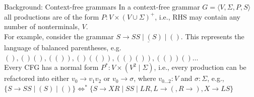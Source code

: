 \documentclass{beamer}
\begin{document}
    \begin{frame}{Background: Context-free grammars}
        In a context-free grammar $G = \langle V, \Sigma, P, S\rangle$ all productions are of the form $P: V\times (V \cup \Sigma)^+$, i.e., RHS may contain any number of nonterminals, $V$.\newline\\
        For example, consider the grammar $\underline{S \rightarrow S S \mid ( S ) \mid ()}$. This represents the language of balanced parentheses, e.g. $(), ()(), (()), ()(()), (()()), (())()\ldots$\newline\\
        Every CFG has a normal form $P^*: V \times (V^2 \mid \Sigma)$, i.e., every production can be refactored into either $v_0 \rightarrow v_1 v_2$ or $v_0 \rightarrow \sigma$, where $v_{0\ldots2}: V$ and $\sigma: \Sigma$, e.g., $\{S \rightarrow S S \mid ( S ) \mid ()\}\Leftrightarrow^*\{S\rightarrow XR \mid SS \mid LR, L \rightarrow (, R \rightarrow ), X\rightarrow LS\}$


\end{frame}
\end{document}
